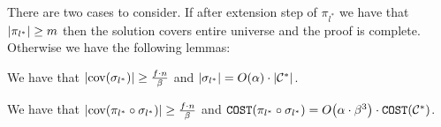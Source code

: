     There are two cases to consider. If after extension step of $\pi_{l^*}$ we have that $\mathopen{}\left| \pi_{l^*} \right| \geq m$ then the solution covers entire universe and the proof is complete. Otherwise we have the following lemmas:
    \begin{lemma}\label{ea:lem:sigma-coverage}
        We have that $\mathopen{}\left| \operatorname{cov}\mathopen{}\left( \sigma_{l^*} \right) \right| \geq \frac{f\cdot n}{\beta}$ and $\mathopen{}\left| \sigma_{l^*} \right| = O\mathopen{}\left( \alpha \right)\cdot \mathopen{}\left| \mathcal{C}^{*} \right|$.
    \end{lemma}
    \begin{lemma}\label{ea:lem:combined-coverage-cost}
        We have that $\mathopen{}\left| \operatorname{cov}\mathopen{}\left( \pi_{l^*} \circ \sigma_{l^*} \right) \right|\geq \frac{f\cdot n}{\beta}$ and $\texttt{COST}\mathopen{}\left( \pi_{l^*} \circ \sigma_{l^*} \right) = O\mathopen{}\left( \alpha\cdot\beta^3 \right)\cdot \texttt{COST}\mathopen{}\left( \mathcal{C}^{*} \right)$.
    \end{lemma}
